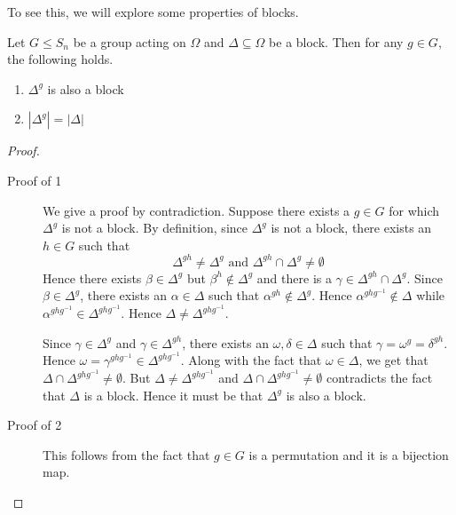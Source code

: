 To see this, we will explore some properties of blocks.
\begin{claim}
	Let $G \le S_n$ be a group acting on $\Omega$ and $\Delta \subseteq \Omega$
	be a block. 
	Then for any $g \in G$, the
	following holds.
	\begin{enumerate}
		\item  $\Delta^g$ is also a block
		\item  $|\Delta^g|  = |\Delta|$
	\end{enumerate} \label{cl:block-prop}
\end{claim}
\begin{proof}
	\begin{description}
		\item[Proof of 1] We give a proof by contradiction. Suppose
			there exists a $g \in G$ for which $\Delta^g$ is not a
			block. By definition, since $\Delta^g$ is not a
			block, there exists an $h \in G$ such that 
			\[ \Delta^{gh} \ne \Delta^g \text{ and } 
			\Delta^{gh} \cap \Delta^g \ne \emptyset\]
			Hence there exists $\beta \in \Delta^g$ but $\beta^h
			\not \in \Delta^g$ and there is a $\gamma \in
			\Delta^{gh} \cap \Delta^g$.
			Since $\beta \in \Delta^g$, there exists an $\alpha
			\in \Delta$ such that $\alpha^{gh} \not \in
			\Delta^g$. Hence $\alpha^{ghg^{-1}} \not \in \Delta$
			while $\alpha^{ghg^{-1}} \in \Delta^{ghg^{-1}}$. Hence
			$\Delta \ne \Delta^{ghg^{-1}}$. 

			Since $\gamma \in \Delta^g$ and $\gamma \in
			\Delta^{gh}$, there exists an $\omega,\delta \in 
			\Delta$ such that $\gamma = \omega^g = \delta^{gh}$. 
			Hence $\omega =	\gamma^{ghg^{-1}} \in 
			\Delta^{ghg^{-1}}$. Along with the fact that
			$\omega \in \Delta$, we get that $\Delta \cap
			\Delta^{ghg^{-1}}\ne \emptyset$. But $\Delta \ne
			\Delta^{ghg^{-1}}$ and $\Delta \cap
			\Delta^{ghg^{-1}}\ne \emptyset$ contradicts the fact
			that $\Delta$ is a block. Hence it must be that
			$\Delta^g$ is also a block.
		\item[Proof of 2] 
		This follows from the fact that $g \in G$ is a permutation
		and it is a bijection map.
	\end{description}
\end{proof}

